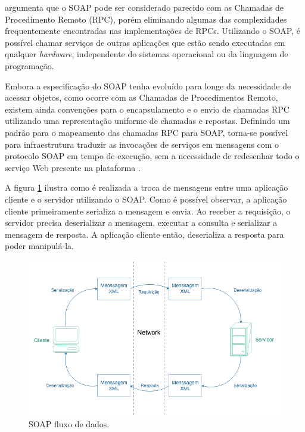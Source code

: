  argumenta que o SOAP pode ser considerado parecido com as Chamadas de Procedimento Remoto (RPC), porém eliminando algumas das complexidades frequentemente encontradas nas implementações de RPCs. Utilizando o SOAP, é possível chamar serviços de outras aplicações que estão sendo executadas em qualquer \textit{hardware}, independente do sistemas operacional ou da linguagem de programação.

Embora a especificação do SOAP tenha evoluído para longe da necessidade de acessar objetos, como ocorre com as Chamadas de Procedimentos Remoto, existem ainda convenções para o encapsulamento e o envio de chamadas RPC utilizando uma representação uniforme de chamadas e repostas. Definindo um padrão para o mapeamento das chamadas RPC para SOAP, torna-se possível para infraestrutura traduzir as invocações de serviços em mensagens com o protocolo SOAP em tempo de execução, sem a necessidade de redesenhar todo o serviço Web presente na plataforma \cite{soap-microsoft}.

A figura \ref{fig:soap} ilustra como é realizada a troca de mensagens entre uma aplicação cliente e o servidor utilizando o SOAP. Como é possível observar, a aplicação cliente primeiramente serializa a mensagem e envia. Ao receber a requisição, o servidor precisa deserializar a mensagem, executar a consulta e serializar a mensagem de resposta. A aplicação cliente então, deserializa a resposta para poder manipulá-la.

\begin{figure}[htbp]
\centering
\includegraphics[width=1\textwidth]{figuras/soap.png}
\caption{SOAP fluxo de dados.}
\label{fig:soap}
\author{https://msdn.microsoft.com/en-us/library/x05s00wz(v=vs.80).aspx}
\end{figure}

